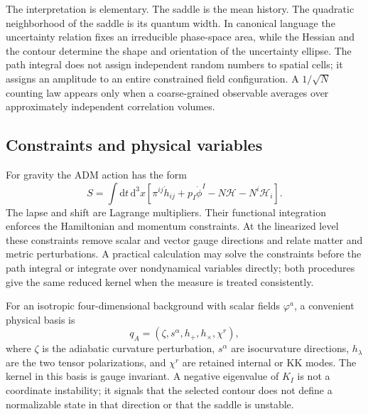 \documentclass[aps,prd,twocolumn,superscriptaddress,nofootinbib,longbibliography]{revtex4-2}
\newcommand{\dd}{\mathrm d}
\begin{document}
The interpretation is elementary. The saddle is the mean history. The quadratic neighborhood of the saddle is its quantum width. In canonical language the uncertainty relation fixes an irreducible phase-space area, while the Hessian and the contour determine the shape and orientation of the uncertainty ellipse. The path integral does not assign independent random numbers to spatial cells; it assigns an amplitude to an entire constrained field configuration. A $1/\sqrt N$ counting law appears only when a coarse-grained observable averages over approximately independent correlation volumes.

\subsection{Constraints and physical variables}
For gravity the ADM action has the form
\begin{equation}
S=\int\dd t\,\dd^3x\left[\pi^{ij}\dot h_{ij}+p_I\dot\phi^I-N\mathcal H-N^i\mathcal H_i\right].
\end{equation}
The lapse and shift are Lagrange multipliers. Their functional integration enforces the Hamiltonian and momentum constraints. At the linearized level these constraints remove scalar and vector gauge directions and relate matter and metric perturbations. A practical calculation may solve the constraints before the path integral or integrate over nondynamical variables directly; both procedures give the same reduced kernel when the measure is treated consistently.

For an isotropic four-dimensional background with scalar fields $\varphi^a$, a convenient physical basis is
\begin{equation}
q_A=(\zeta,s^\alpha,h_+,h_\times,\chi^r),
\end{equation}
where $\zeta$ is the adiabatic curvature perturbation, $s^\alpha$ are isocurvature directions, $h_\lambda$ are the two tensor polarizations, and $\chi^r$ are retained internal or KK modes. The kernel in this basis is gauge invariant. A negative eigenvalue of $K_I$ is not a coordinate instability; it signals that the selected contour does not define a normalizable state in that direction or that the saddle is unstable.
\end{document}
